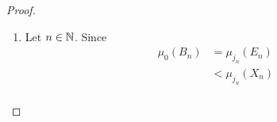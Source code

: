 \documentclass{book}
\begin{document}
\begin{proof}
\begin{enumerate}
\begin{enumerate}
\begin{itemize}
\begin{align*}
						& \subset B_n.
					\end{align*} 
					and therefore 
					\begin{align*}
						\bigcap\limits_{n \in \N} D_n 
						& \subset \bigcap\limits_{n \in \N} B_n \\
						& = \varnothing.
					\end{align*} 
					\item By construction, for each $m \in \N$, 
					\begin{align*}
						\mu_0(B_m \setminus C_m)
						& = \mu_0 \bigg[ \pi_{j_m}^{-1}(E_m) \cap (\pi_{j_m}^{-1}(K_m)^c) \bigg] \\
						& = \mu_0 \bigg[ \pi_{j_m}^{-1}(E_m) \cap \pi_{j_m}^{-1}(K_m^c) \bigg] \\
						& = \mu_0 \bigg[ \pi_{j_m}^{-1}(E_m \cap K_m^c) \bigg] \\
						& = \mu_0 \bigg[ \pi_{j_m}^{-1}(E_m \setminus K_m) \bigg] \\
						& = \mu_{j_m}(E_m \setminus K_m) \\
						& < \frac{\del}{2^m}.
					\end{align*}
					Since $\mu_0$ is finitely additive,   implies that $\mu_0$ is finitely-subadditive. Since $(B_n)_{n \in \N}$ is decreasing, we have that for each $n \in \N$,
					\begin{align*}
						\mu_0(B_n \setminus D_n)
						& = \mu_0 \bigg[ B_n \cap (\bigcap\limits_{m=1}^n C_m)^c \bigg] \\
						& = \mu_0 \bigg[ B_n \cap (\bigcup\limits_{m=1}^n C_m^c) \bigg] \\
						& = \mu_0 \bigg[\bigcup\limits_{m=1}^n (B_n \cap C_m^c) \bigg] \\
						& \leq \mu_0 \bigg[\bigcup\limits_{m=1}^n (B_m \cap C_m^c) \bigg] \\
						& \leq \sum\limits_{m=1}^n \mu_0(B_m \cap C_m^c) \\
						& = \sum\limits_{m=1}^n \mu_0(B_m \setminus C_m) \\
						& < \sum\limits_{m=1}^n \frac{\del}{2^m} \\
						& < \del.
					\end{align*}
				\end{itemize}
				\item Let $n \in \N$. Since 
				\begin{align*}
					\mu_0(B_n)
					& = \mu_{j_n}(E_n) \\
					& < \mu_{j_n}(X_n) \\

\end{align*}
\end{enumerate}
\end{enumerate}
\end{proof}
\end{document}
